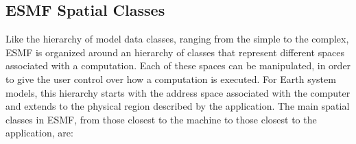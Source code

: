 \subsection{ESMF Spatial Classes}
\label{sec:spatialclasses}

Like the hierarchy of model data classes, ranging from the 
simple to the complex, ESMF is organized around an hierarchy of 
classes that represent different spaces associated with a computation.
Each of these spaces can be manipulated, in order to give
the user control over how a computation is executed.  For Earth system
models, this hierarchy starts with the address space associated
with the computer and extends to the physical region described by
the application.   The main spatial classes in ESMF, from
those closest to the machine to those closest to the application, are:

